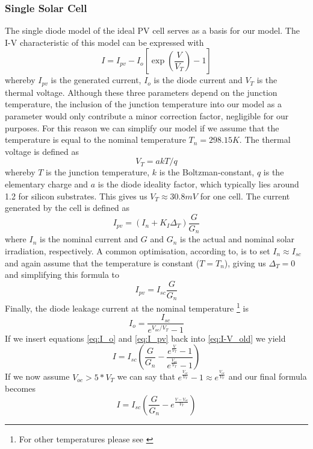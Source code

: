 \subsubsection{Single Solar Cell}

The single diode model of  the ideal PV cell\cite{ref:villa:pvmodel} serves as
a basis for our model.  The I-V  characteristic of this model can be expressed
with
\begin{equation} \label{eq:I-V_old}
    I = I_{pv} - I_o \left[ \exp \left( \frac{V}{V_T} \right) - 1 \right]
\end{equation}
whereby $I_{pv}$  is the  generated current,  $I_o$ is  the diode  current and
$V_T$ is the  thermal voltage.  Although these three parameters  depend on the
junction temperature, the inclusion of the junction temperature into our model
as a parameter would only contribute a minor correction factor, negligible for
our purposes.  For this reason we can simplify our model if we assume that the
temperature is equal  to the nominal temperature $T_n  = 298.15K$. The thermal
voltage is defined as
\begin{equation}
    V_T = a k T / q
\end{equation}
whereby $T$ is the junction temperature,  $k$ is the Boltzman-constant, $q$ is
the elementary  charge and $a$ is  the diode ideality factor,  which typically
lies around 1.2 for silicon substrates. This gives us $V_T \approx 30.8mV$ for
one cell. The current generated by the cell is defined as
\begin{equation}
    I_{pv} = \left( I_n + K_I \Delta_T \right) \frac{G}{G_n}
\end{equation}
where $I_n$ is the  nominal  current and $G$ and $G_n$ is the actual and nominal
solar   irradiation,   respectively.    A    common    optimisation,   according
to\cite{ref:villa:pvmodel}, is to set $I_n \approx I_{sc}$ and again assume that
the  temperature  is  constant  ($T  =  T_n$), giving  us  $\Delta_T  =  0$  and
simplifying this formula to
\begin{equation} \label{eq:I_pv}
    I_{pv} = I_{sc} \frac{G}{G_n}
\end{equation}
Finally, the  diode  leakage  current  at  the nominal temperature \footnote{For
other temperatures please see \cite{ref:villa:pvmodel}} is
\begin{equation} \label{eq:I_o}
    I_o = \frac{I_{sc}}{e^{V_{oc} / V_T} - 1}
\end{equation}
If  we   insert   equations   \eqref{eq:I_o}   and   \eqref{eq:I_pv}  back  into
\eqref{eq:I-V_old} we yield
\begin{equation}
    I = I_{sc} \left( \frac{G}{G_n} - \frac{e^{\frac{V}{V_T}}-1}{e^{\frac{V_{oc}}{V_T}}-1} \right)
\end{equation}
If we now assume $V_{oc} > 5 * V_T$ we can  say  that  $e^{\frac{V_{oc}}{V_T}}-1
\approx e^{\frac{V_{oc}}{V_T}}$ and our final formula becomes
\begin{equation} \label{eq:I-V}
    I = I_{sc} \left( \frac{G}{G_n} - e^{\frac{V - V_{oc}}{V_T}} \right)
\end{equation}



